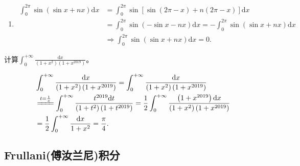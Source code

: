\documentclass[../../main.tex]{subfiles}%
\begin{document}
\begin{solution}
\begin{enumerate}
\item\begin{align*}
\int_0^{2\pi}{\sin \left( \sin x+nx \right) \mathrm{d}x}&=\int_0^{2\pi}{\sin \left[ \sin \left( 2\pi -x \right) +n\left( 2\pi -x \right) \right] \mathrm{d}x}
\\
&=\int_0^{2\pi}{\sin \left( -\sin x-nx \right) \mathrm{d}x}=-\int_0^{2\pi}{\sin \left( \sin x+nx \right) \mathrm{d}x}
\\
&\Longrightarrow \int_0^{2\pi}{\sin \left( \sin x+nx \right) \mathrm{d}x}=0.
\end{align*} 
\end{enumerate}

\end{solution}

\begin{example}
计算$\int_{0}^{+\infty} \frac{\mathrm{d}x}{\left(1 + x^2\right)\left(1 + x^{2019}\right)}$。
\end{example}
\begin{solution}
\begin{align*}
&\int_0^{+\infty}{\frac{\mathrm{d}x}{\left( 1+x^2 \right) \left( 1+x^{2019} \right)}}=\int_0^{+\infty}{\frac{\mathrm{d}x}{\left( 1+x^2 \right) \left( 1+x^{2019} \right)}}
\\
&\xlongequal{t=\frac{1}{x}}\int_0^{+\infty}{\frac{t^{2019}\mathrm{d}t}{\left( 1+t^2 \right) \left( 1+t^{2019} \right)}}=\frac{1}{2}\int_0^{+\infty}{\frac{\left( 1+x^{2019} \right) \mathrm{d}x}{\left( 1+x^2 \right) \left( 1+x^{2019} \right)}}
\\
&=\frac{1}{2}\int_0^{+\infty}{\frac{\mathrm{d}x}{1+x^2}}=\frac{\pi}{4}.
\end{align*}

\end{solution}




\subsection{Frullani(傅汝兰尼)积分}
\end{document}
